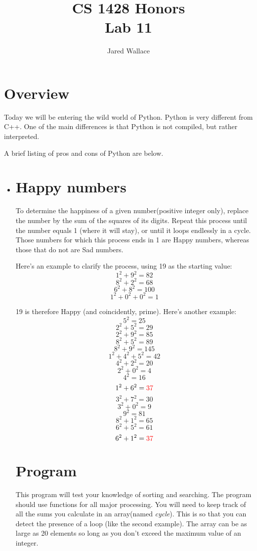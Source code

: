 \documentclass[letterpaper,12pt]{article}
\title{\Large CS 1428 Honors\\Lab 11}
\author{Jared Wallace}
\date{}
\begin{document}
\maketitle

\vspace{30mm}

\section*{Overview}
Today we will be entering the wild world of Python. Python is very different from
C++. One of the main differences is that Python is not compiled, but rather interpreted.

A brief listing of pros and cons of Python are below.
\begin{itemize}
    \item 

\section*{Happy numbers}
To determine the happiness of a given number(positive integer only), replace the number
by the sum of the squares of its digits. Repeat this process until the number equals 1
(where it will stay), or until it loops endlessly in a cycle. Those numbers for which
this process ends in 1 are Happy numbers, whereas those that do not are Sad numbers.

Here's an example to clarify the process, using 19 as the starting value:
$$1^{2} + 9^{2} = 82$$
$$8^{2} + 2^{2} = 68$$
$$6^{2} + 8^{2} = 100$$
$$1^{2} + 0^{2} + 0^{2} = 1$$

19 is therefore Happy (and coincidently, prime). Here's another example:
$$5^{2} = 25$$
$$2^{2} + 5^{2} = 29$$
$$2^{2} + 9^{2} = 85$$
$$8^{2} + 5^{2} = 89$$
$$8^{2} + 9^{2} = 145$$
$$1^{2} + 4^{2} + 5^{2} = 42$$
$$4^{2} + 2^{2} = 20$$
$$2^{2} + 0^{2} = 4$$
$$4^{2} = 16$$
$$1^{2} + 6^{2} = \textcolor{red}{37}$$
$$3^{2} + 7^{2} = 30$$
$$3^{2} + 0^{2} = 9$$
$$9^{2} = 81$$
$$8^{2} + 1^{2} = 65$$
$$6^{2} + 5^{2} = 61$$
$$6^{2} + 1^{2} = \textcolor{red}{37}$$

\section*{Program}
This program will test your knowledge of sorting and searching. The program
should use functions for all major processing.
You will need to keep track of all the sums you calculate in an array(named \emph{cycle}).
This is so that you can detect the presence of a loop (like the second example). The array 
can be as large as 20 elements so long as you don’t exceed the maximum
value of an integer.


\end{itemize}
\end{document}
